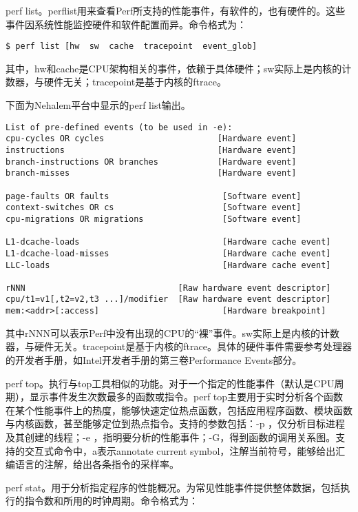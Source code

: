 \documentclass[]{ctexbook}
\begin{document}
perf list。perflist用来查看Perf所支持的性能事件，有软件的，也有硬件的。这些事件因系统性能监控硬件和软件配置而异。命令格式为：

\texttt{\$\ perf\ list\ {[}hw\ \textbar{}\ sw\ \textbar{}\ cache\ \textbar{}\ tracepoint\ \textbar{}\ event\_glob{]}}

其中，hw和cache是CPU架构相关的事件，依赖于具体硬件；sw实际上是内核的计数器，与硬件无关；tracepoint是基于内核的ftrace。

下面为Nehalem平台中显示的perf list输出。

\begin{verbatim}
List of pre-defined events (to be used in -e):
cpu-cycles OR cycles                       [Hardware event]
instructions                               [Hardware event]
branch-instructions OR branches            [Hardware event]
branch-misses                              [Hardware event]

page-faults OR faults                       [Software event]
context-switches OR cs                      [Software event]
cpu-migrations OR migrations                [Software event]

L1-dcache-loads                             [Hardware cache event]
L1-dcache-load-misses                       [Hardware cache event]
LLC-loads                                   [Hardware cache event]

rNNN                               [Raw hardware event descriptor]
cpu/t1=v1[,t2=v2,t3 ...]/modifier  [Raw hardware event descriptor]
mem:<addr>[:access]                         [Hardware breakpoint]
\end{verbatim}

其中rNNN可以表示Perf中没有出现的CPU的``裸''事件。sw实际上是内核的计数器，与硬件无关。tracepoint是基于内核的ftrace。具体的硬件事件需要参考处理器的开发者手册，如Intel开发者手册的第三卷Performance Events部分。

perf top。执行与top工具相似的功能。对于一个指定的性能事件（默认是CPU周期），显示事件发生次数最多的函数或指令。perf top主要用于实时分析各个函数在某个性能事件上的热度，能够快速定位热点函数，包括应用程序函数、模块函数与内核函数，甚至能够定位到热点指令。支持的参数包括：-p ，仅分析目标进程及其创建的线程；-e ，指明要分析的性能事件；-G，得到函数的调用关系图。支持的交互式命令中，a表示annotate current symbol，注解当前符号，能够给出汇编语言的注解，给出各条指令的采样率。

perf stat。用于分析指定程序的性能概况。为常见性能事件提供整体数据，包括执行的指令数和所用的时钟周期。命令格式为：
\end{document}
